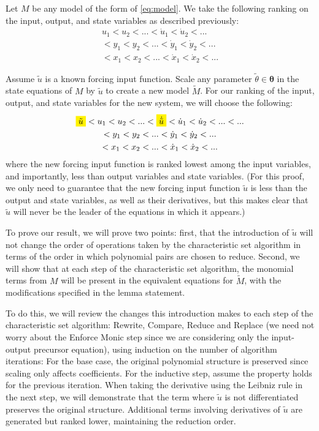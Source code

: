 \documentclass[a4paper,fleqn]{cas-dc}
\newcommand{\mathcolorbox}[2]{\colorbox{#1}{$\displaystyle #2$}}
\theoremstyle{definition}
\begin{document}
\begin{pf}
    Let $M$ be any model of the form of \cref{eq:model}. 
    We take the following ranking on the input, output, and state variables as described previously:
    \begin{multline}
        u_1 < u_2 < ... < \dot{u}_1 < \dot{u}_2 < ...\\  < y_1 < y_2< ... <\dot{y}_1 < \dot{y}_2 < ...\\  < x_1 < x_2 < ...<\dot{x}_1 < \dot{x}_2 < ...
    \end{multline}

    Assume $\tilde{u}$ is a known forcing input function.
    Scale any parameter $\tilde{\theta} \in \pmb{\theta}$ in the state equations of $M$ by $\tilde{u}$ to create a new model $\tilde{M}$.
    For our ranking of the input, output, and state variables for the new system, we will choose the following:
    \begin{multline}
        \mathcolorbox{Yellow}{\tilde{u}} < u_1 < u_2 < ...< \mathcolorbox{Yellow}{\dot{\tilde{u}}} < \dot{u}_1 < \dot{u}_2 < ... < ...\\  < y_1 < y_2 < ... <\dot{y}_1 < \dot{y}_2 < ... \\< x_1 < x_2 < ...<\dot{x}_1 < \dot{x}_2 < ...
    \end{multline}
    where the new forcing input function is ranked lowest among the input variables, and importantly, less than output variables and state variables. 
    (For this proof, we only need to guarantee that the new forcing input function $\tilde{u}$ is less than the output and state variables, as well as their derivatives, but this makes clear that $\tilde{u}$ will never be the leader of the equations in which it appears.)

    To prove our result, we will prove two points: first, that the introduction of $\tilde{u}$ will not change the order of operations taken by the characteristic set algorithm in terms of the order in which polynomial pairs are chosen to reduce. Second, we will show that at each step of the characteristic set algorithm, the monomial terms from $M$ will be present in the equivalent equations for $\tilde{M}$, with the modifications specified in the lemma statement.
    
    To do this, we will review the changes this introduction makes to each step of the characteristic set algorithm: Rewrite, Compare, Reduce and Replace (we need not worry about the Enforce Monic step since we are considering only the input-output precursor equation), using induction on the number of algorithm iterations: For the base case, the original polynomial structure is preserved since scaling only affects coefficients. For the inductive step, assume the property holds for the previous iteration. When taking the derivative using the Leibniz rule in the next step, we will demonstrate that the term where $\tilde{u}$ is not differentiated preserves the original structure. Additional terms involving derivatives of $\tilde{u}$ are generated but ranked lower, maintaining the reduction order.
    

\end{pf}
\end{document}
